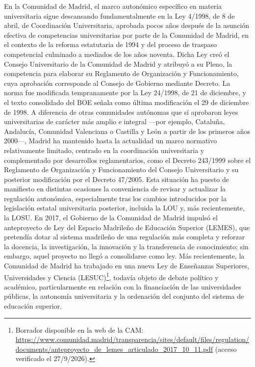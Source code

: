 \documentclass[
  11pt,
  a4paper,
  twoside]{scrreprt}
\begin{document}
En la Comunidad de Madrid, el marco autonómico específico en materia
universitaria sigue descansando fundamentalmente en la Ley 4/1998, de 8
de abril, de Coordinación Universitaria, aprobada pocos años después de
la asunción efectiva de competencias universitarias por parte de la
Comunidad de Madrid, en el contexto de la reforma estatutaria de 1994 y
del proceso de traspaso competencial culminado a mediados de los años
noventa. Dicha Ley creó el Consejo Universitario de la Comunidad de
Madrid y atribuyó a su Pleno, la competencia para elaborar su Reglamento
de Organización y Funcionamiento, cuya aprobación corresponde al Consejo
de Gobierno mediante Decreto. La norma fue modificada tempranamente por
la Ley 24/1998, de 21 de diciembre, y el texto consolidado del BOE
señala como última modificación el 29 de diciembre de 1998. A diferencia
de otras comunidades autónomas que sí aprobaron leyes universitarias de
carácter más amplio e integral ---por ejemplo, Cataluña, Andalucía,
Comunidad Valenciana o Castilla y León a partir de los primeros años
2000---, Madrid ha mantenido hasta la actualidad un marco normativo
relativamente limitado, centrado en la coordinación universitaria y
complementado por desarrollos reglamentarios, como el Decreto 243/1999
sobre el Reglamento de Organización y Funcionamiento del Consejo
Universitario y su posterior modificación por el Decreto 47/2005. Esta
situación ha puesto de manifiesto en distintas ocasiones la conveniencia
de revisar y actualizar la regulación autonómica, especialmente tras los
cambios introducidos por la legislación estatal universitaria posterior,
incluida la LOU y, más recientemente, la LOSU. En 2017, el Gobierno de
la Comunidad de Madrid impulsó el anteproyecto de Ley del Espacio
Madrileño de Educación Superior (LEMES), que pretendía dotar al sistema
madrileño de una regulación más completa y reforzar la docencia, la
investigación, la innovación y la transferencia de conocimiento; sin
embargo, aquel proyecto no llegó a consolidarse como ley. Más
recientemente, la Comunidad de Madrid ha trabajado en una nueva Ley de
Enseñanzas Superiores, Universidades y Ciencia (LESUC)\footnote{Borrador
  disponible en la web de la CAM:
  \url{https://www.comunidad.madrid/transparencia/sites/default/files/regulation/documents/anteproyecto_de_lemes_articulado_2017_10_11.pdf}
  (acceso verificado el 27/9/2026).}, todavía objeto de debate político
y académico, particularmente en relación con la financiación de las
universidades públicas, la autonomía universitaria y la ordenación del
conjunto del sistema de educación superior.
\end{document}

